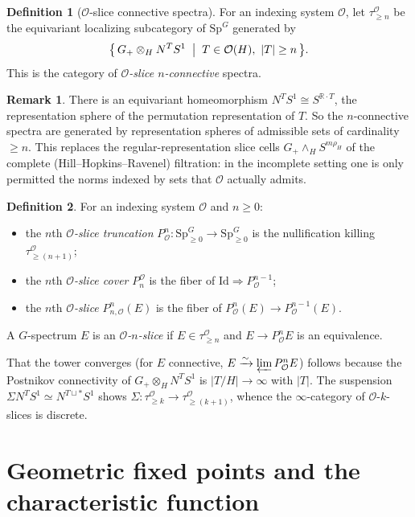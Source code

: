 \documentclass[11pt]{article}
\newcommand{\aO}{\mathcal{O}}
\newcommand{\Sp}{\mathrm{Sp}}
\newcommand{\R}{\mathbb{R}}
\theoremstyle{definition}
\newtheorem{definition}{Definition}
\newtheorem{remark}{Remark}
\begin{document}
\begin{definition}[$\aO$-slice connective spectra]
For an indexing system $\aO$, let $\tau^\aO_{\ge n}$ be the equivariant
localizing subcategory of $\Sp^G$ generated by
\[
\bigl\{\, G_+\otimes_H N^T S^1 \;\bigm|\; T\in\aO(H),\ |T|\ge n \,\bigr\}.
\]
This is the category of \emph{$\aO$-slice $n$-connective} spectra.
\end{definition}

\begin{remark}
There is an equivariant homeomorphism $N^T S^1\cong S^{\R\cdot T}$, the
representation sphere of the permutation representation of $T$. So the
$n$-connective spectra are generated by representation spheres of admissible
sets of cardinality $\ge n$. This replaces the regular-representation slice cells
$G_+\wedge_H S^{m\rho_H}$ of the complete (Hill--Hopkins--Ravenel) filtration:
in the incomplete setting one is only permitted the norms indexed by sets that
$\aO$ actually admits.
\end{remark}

\begin{definition}
For an indexing system $\aO$ and $n\ge 0$:
\begin{itemize}\setlength\itemsep{2pt}
\item the $n$th \emph{$\aO$-slice truncation} $P^n_\aO:\Sp^G_{\ge 0}\to
\Sp^G_{\ge 0}$ is the nullification killing $\tau^\aO_{\ge(n+1)}$;
\item the $n$th \emph{$\aO$-slice cover} $P^\aO_n$ is the fiber of
$\mathrm{Id}\Rightarrow P^{n-1}_\aO$;
\item the $n$th \emph{$\aO$-slice} $P^n_{n,\aO}(E)$ is the fiber of
$P^n_\aO(E)\to P^{n-1}_\aO(E)$.
\end{itemize}
A $G$-spectrum $E$ is an \emph{$\aO$-$n$-slice} if $E\in\tau^\aO_{\ge n}$ and
$E\to P^n_\aO E$ is an equivalence.
\end{definition}

That the tower converges (for $E$ connective, $E\xrightarrow{\sim}\varprojlim
P^n_\aO E$) follows because the Postnikov connectivity of $G_+\otimes_H N^T S^1$
is $|T/H|\to\infty$ with $|T|$. The suspension $\Sigma N^T S^1\simeq N^{T\sqcup
\ast}S^1$ shows $\Sigma:\tau^\aO_{\ge k}\to\tau^\aO_{\ge(k+1)}$, whence the
$\infty$-category of $\aO$-$k$-slices is discrete.

\section*{Geometric fixed points and the characteristic function}
\end{document}
